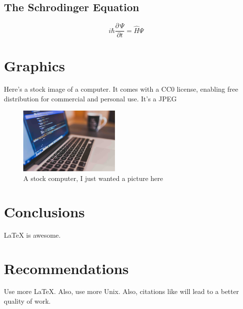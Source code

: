\documentclass{workreport}
\begin{document}
\begin{body}
\subsection{The Schrodinger Equation}

	\begin{equation}
		i\hbar \frac{\partial \, \Psi}{\partial t} = \hat{H}\Psi
	\end{equation}

\section{Graphics}
    Here's a stock image of a computer. It comes with a CC0 license, enabling
    free distribution for commercial and personal use. It's a JPEG

    \begin{figure}[!ht]
    	\centering
        \label{fig:stock_computer}
        \includegraphics[width=5cm]{./stock-image.jpg}
        \caption{A stock computer, I just wanted a picture here}
    \end{figure}

\section{Conclusions}
	\gls{LaTeX} is awesome.

\section{Recommendations}

	Use more \LaTeX. Also, use more \gls{Unix}. Also, citations like
    \cite{schweiger_principles_2001} will lead to a better quality of work.

\end{body}


\end{document}
